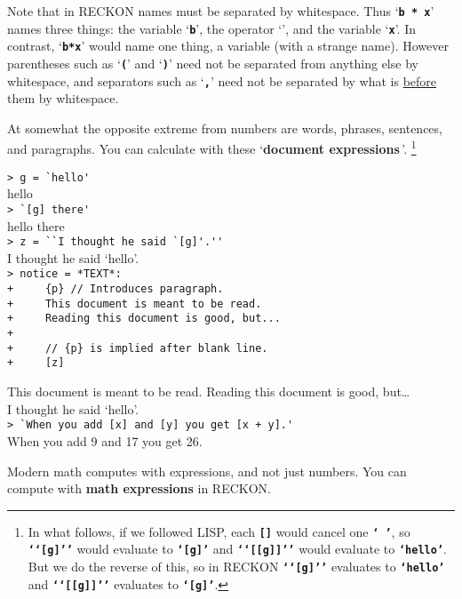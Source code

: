 \documentclass[12pt]{article}
\newcommand{\TT}[1]{{\tt \bfseries #1}}
\newcommand{\key}[1]{{\rm \bfseries #1}}
\newenvironment{indpar}[1][0.3in]%
	{\begin{list}{}%
		     {\setlength{\itemsep}{0in}%
		      \setlength{\topsep}{0in}%
		      \setlength{\parsep}{1ex}%
		      \setlength{\labelwidth}{#1}%
		      \setlength{\leftmargin}{#1}%
		      \addtolength{\leftmargin}{\labelsep}}%
	 \item}%
	{\end{list}}
\begin{document}
Note that in RECKON names must be separated by whitespace.  Thus
`\TT{b * x}' names three things: the variable `\TT{b}', the
operator `\TT{*}', and the variable `\TT{x}'.  In contrast,
`\TT{b*x}' would name one thing, a variable (with a strange name).
However parentheses such as `\TT{(}' and `\TT{)}' need not be
separated from anything else by whitespace, and separators such as
`\TT{,}' need not be separated by what is \underline{before} them
by whitespace.

At somewhat the opposite extreme from numbers are words, phrases, sentences,
and paragraphs.  You can calculate with these `\key{document expressions}\,'.%
\footnote{In what follows,
if we followed LISP, each \TT{[]} would cancel one \TT{`~'},
so \TT{`{}`[g]'{}'} would evaluate to \TT{`[g]'}
and \TT{`{}`[[g]]'{}'} would evaluate to \TT{`hello'}.  But we do the
reverse of this, so in RECKON \TT{`{}`[g]'{}'} evaluates to \TT{`hello'}
and \TT{`{}`[[g]]'{}'} evaluates to \TT{`[g]'}.}

\begin{indpar}
\verb|> g = `hello'| \\
hello \\
\verb|> `[g] there'| \\
hello there \\
\verb|> z = ``I thought he said `[g]'.''| \\
I thought he said `hello'. \\
\verb|> notice = *TEXT*:| \\
\verb|+     {p} // Introduces paragraph.| \\
\verb|+     This document is meant to be read.| \\
\verb|+     Reading this document is good, but...| \\
\verb|+     | \\
\verb|+     // {p} is implied after blank line.| \\
\verb|+     [z]|

This document is meant to be read.  Reading this document is good, but\ldots
\\[2ex]
I thought he said `hello'. \\
\verb|> `When you add [x] and [y] you get [x + y].'| \\
When you add 9 and 17 you get 26.
\end{indpar}

Modern math computes with expressions, and not just numbers.
You can compute with \key{math expressions} in RECKON.
\end{document}
